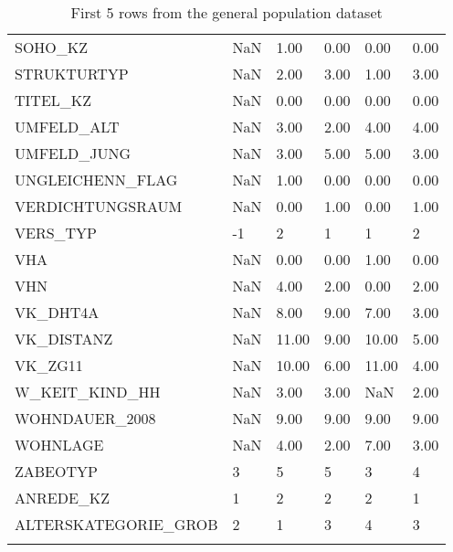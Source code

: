 \begin{longtable}{lp{1cm}p{1cm}p{1cm}p{1cm}p{1cm}}
SOHO\_KZ  & NaN & 1.00 & 0.00 & 0.00 & 0.00 \\
STRUKTURTYP & NaN & 2.00 & 3.00 & 1.00 & 3.00 \\
TITEL\_KZ & NaN & 0.00 & 0.00 & 0.00 & 0.00 \\
UMFELD\_ALT & NaN & 3.00 & 2.00 & 4.00 & 4.00 \\
UMFELD\_JUNG & NaN & 3.00 & 5.00 & 5.00 & 3.00 \\
UNGLEICHENN\_FLAG   & NaN & 1.00 & 0.00 & 0.00 & 0.00 \\
VERDICHTUNGSRAUM   & NaN & 0.00 & 1.00 & 0.00 & 1.00 \\
VERS\_TYP &  -1 & 2 & 1 & 1 & 2 \\
VHA  & NaN & 0.00 & 0.00 & 1.00 & 0.00 \\
VHN  & NaN & 4.00 & 2.00 & 0.00 & 2.00 \\
VK\_DHT4A & NaN & 8.00 & 9.00 & 7.00 & 3.00 \\
VK\_DISTANZ & NaN &  11.00 & 9.00 &  10.00 & 5.00 \\
VK\_ZG11  & NaN &  10.00 & 6.00 &  11.00 & 4.00 \\
W\_KEIT\_KIND\_HH   & NaN & 3.00 & 3.00 & NaN & 2.00 \\
WOHNDAUER\_2008   & NaN & 9.00 & 9.00 & 9.00 & 9.00 \\
WOHNLAGE & NaN & 4.00 & 2.00 & 7.00 & 3.00 \\
ZABEOTYP & 3 & 5 & 5 & 3 & 4 \\
ANREDE\_KZ & 1 & 2 & 2 & 2 & 1 \\
ALTERSKATEGORIE\_GROB & 2 & 1 & 3 & 4 & 3 \\
\caption{First 5 rows from the general population dataset}
\label{tab:AZDIAS} \\
\end{longtable}